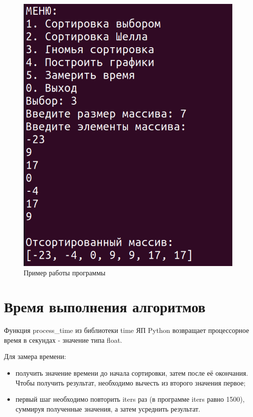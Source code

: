 \begin{figure}[H]
	\begin{center}
		\includegraphics[scale=0.4]{img/example.png}
	\end{center}
	\captionsetup{justification=centering}
	\caption{Пример работы программы}
	\label{img:example}
\end{figure}

\section{Время выполнения алгоритмов}

Функция process\_time из библиотеки time ЯП Python возвращает  процессорное время в секундах - значение типа float.

Для замера времени:
\begin{itemize}
	\item получить значение времени до начала сортировки, затем после её окончания. Чтобы получить результат, необходимо вычесть из второго значения первое;
	\item первый шаг необходимо повторить iters раз (в программе iters равно 1500), суммируя полученные значения, а затем усреднить результат.
\end{itemize}


